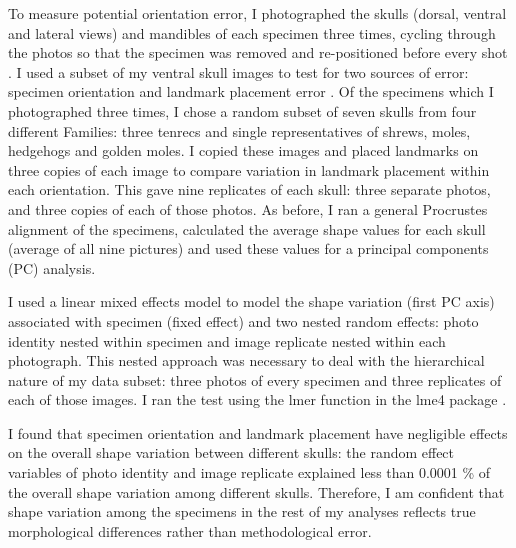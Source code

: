 	To measure potential orientation error, I photographed the skulls (dorsal, ventral and lateral views) and mandibles of each specimen three times, cycling through the photos so that the specimen was removed and re-positioned before every shot \citep{Viscosi2011}.
	I used a subset of my ventral skull images to test for two sources of error: specimen orientation and landmark placement error \citep{Arnqvist1998, Barrow2008}. Of the specimens which I photographed three times,  I chose a random subset of seven skulls from four different Families: three tenrecs and single representatives of shrews, moles, hedgehogs and golden moles. I copied these images and placed landmarks on three copies of each image to compare variation in landmark placement within each orientation. This gave nine replicates of each skull: three separate photos, and three copies of each of those photos. As before, I ran a general Procrustes alignment \citep{Rohlf1993} of the specimens, calculated the average shape values for each skull (average of all nine pictures) and used these values for a principal components (PC) analysis. 
		
	I used a linear mixed effects model to model the shape variation (first PC axis) associated with specimen (fixed effect) and two nested random effects: photo identity nested within specimen and image replicate nested within each photograph. This nested approach was necessary to deal with the hierarchical nature of my data subset: three photos of every specimen and three replicates of each of those images. I ran the test using the lmer function in the lme4 package \citep{Bates2014}.  

	I found that specimen orientation and landmark placement have negligible effects on the overall shape variation between different skulls: the random effect variables of photo identity and image replicate explained less than 0.0001 \% of the overall shape variation among different skulls. Therefore, I am confident that shape variation among the specimens in the rest of my analyses reflects true morphological differences rather than methodological error.







